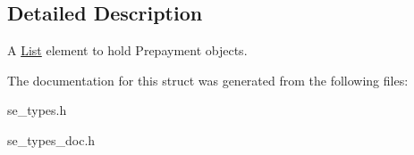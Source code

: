 \subsection{Detailed Description}
A \hyperlink{structList}{List} element to hold Prepayment objects. 

The documentation for this struct was generated from the following files\+:\begin{DoxyCompactItemize}
\item 
se\+\_\+types.\+h\item 
se\+\_\+types\+\_\+doc.\+h\end{DoxyCompactItemize}
